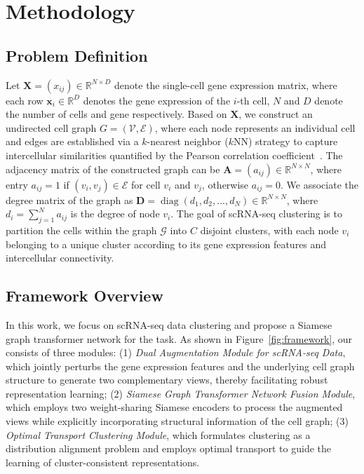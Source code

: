 \section{Methodology}
\label{sec::method}

\subsection{Problem Definition}
Let $\bm{X}=(x_{ij})\in\mathbb{R}^{N\times D}$ denote the single-cell gene expression matrix, where each row $\bm{x}_i\in\mathbb{R}^D$ denotes the gene expression of the $i$-th cell, $N$ and $D$ denote the number of cells and gene respectively. Based on $\bm{X}$, we construct an undirected cell graph $G = (\mathcal{V}, \mathcal{E})$, where each node represents an individual cell and edges are established via a $k$-nearest neighbor ($k$NN) strategy to capture intercellular similarities quantified by the Pearson correlation coefficient~\cite{benesty2009pearson}. The adjacency matrix of the constructed graph can be $\bm{A}=(a_{ij})\in\mathbb{R}^{N\times N}$, where entry $a_{ij}=1$ if $(v_i, v_j)\in\mathcal{E}$ for cell $v_i$ and $v_j$, otherwise $a_{ij}=0$. We associate the degree matrix of the graph as $\bm{D} = \operatorname{diag}(d_1, d_2, \ldots, d_N)\in\mathbb{R}^{N\times N}$, where $d_i = \sum_{j=1}^{N} a_{ij}$ is the degree of node $v_i$. The goal of scRNA-seq clustering is to partition the cells within the graph $\mathcal{G}$ into $C$ disjoint clusters, with each node $v_i$ belonging to a unique cluster according to its gene expression features and intercellular connectivity.


\subsection{Framework Overview}
In this work, we focus on scRNA-seq data clustering and propose a Siamese graph transformer network for the task. As shown in Figure~\ref{fig:framework}, our \method{} consists of three modules: (1) \textit{Dual Augmentation Module for scRNA-seq Data}, which jointly perturbs the gene expression features and the underlying cell graph structure to generate two complementary views, thereby facilitating robust representation learning; (2) \textit{Siamese Graph Transformer Network Fusion Module}, which employs two weight-sharing Siamese encoders to process the augmented views while explicitly incorporating structural information of the cell graph; (3) \textit{Optimal Transport Clustering Module}, which formulates clustering as a distribution alignment problem and employs optimal transport to guide the learning of cluster-consistent representations.

